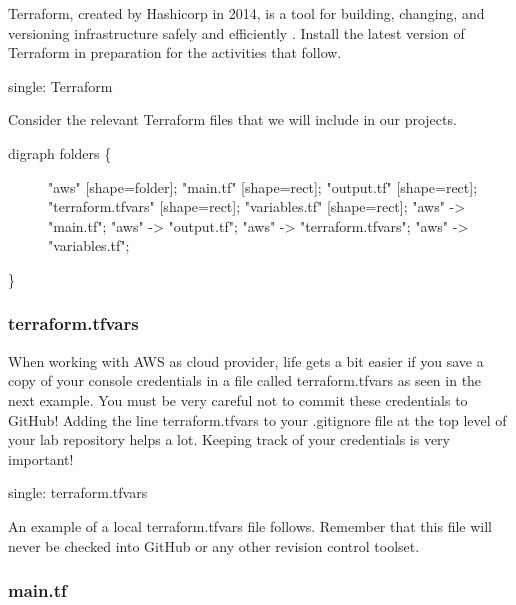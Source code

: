 Terraform, created by Hashicorp in 2014, is a tool for building,
changing, and versioning infrastructure safely and efficiently . Install
the latest version of Terraform in preparation for the activities that
follow.

single: Terraform

Consider the relevant Terraform files that we will include in our
projects.

\begin{description}
\item[digraph folders \{]
"aws" {[}shape=folder{]}; "main.tf" {[}shape=rect{]}; "output.tf"
{[}shape=rect{]}; "terraform.tfvars" {[}shape=rect{]}; "variables.tf"
{[}shape=rect{]}; "aws" -\textgreater{} "main.tf"; "aws" -\textgreater{}
"output.tf"; "aws" -\textgreater{} "terraform.tfvars"; "aws"
-\textgreater{} "variables.tf";
\end{description}

\}

\hypertarget{terraform.tfvars}{%
\subsubsection{terraform.tfvars}\label{terraform.tfvars}}

When working with AWS as cloud provider, life gets a bit easier if you
save a copy of your console credentials in a file called
terraform.tfvars as seen in the next example. You must be very careful
not to commit these credentials to GitHub! Adding the line
terraform.tfvars to your .gitignore file at the top level of your lab
repository helps a lot. Keeping track of your credentials is very
important!

single: terraform.tfvars

An example of a local terraform.tfvars file follows. Remember that this
file will never be checked into GitHub or any other revision control
toolset.

\begin{Shaded}
\begin{Highlighting}[]
\end{Highlighting}
\end{Shaded}

\hypertarget{main.tf}{%
\subsubsection{main.tf}\label{main.tf}}

